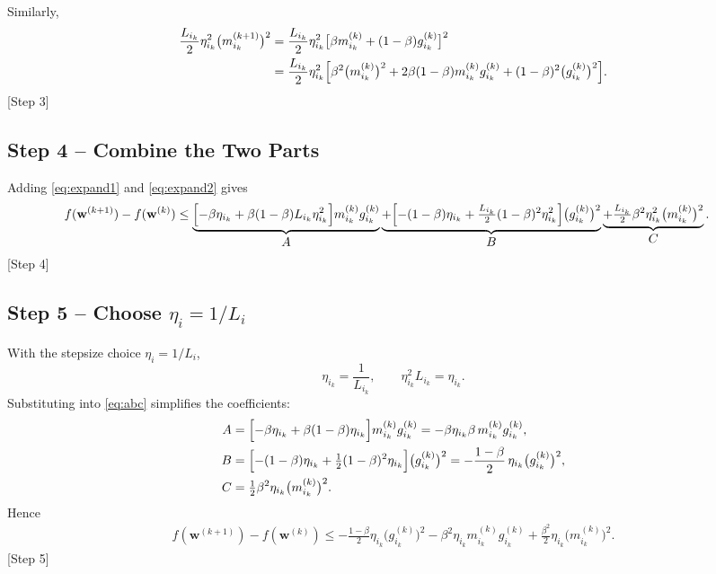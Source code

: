 \documentclass{article}
\begin{document}
Similarly,
\begin{align}
\frac{L_{i_k}}{2}\eta_{i_k}^{2}\bigl(m_{i_k}^{(k+1)}\bigr)^{2}
&=\frac{L_{i_k}}{2}\eta_{i_k}^{2}
   \bigl[\beta m_{i_k}^{(k)}+(1-\beta)g_{i_k}^{(k)}\bigr]^{2} \nonumber\\
&=\frac{L_{i_k}}{2}\eta_{i_k}^{2}
   \Bigl[\beta^{2}\bigl(m_{i_k}^{(k)}\bigr)^{2}
        +2\beta(1-\beta)m_{i_k}^{(k)}g_{i_k}^{(k)}
        +(1-\beta)^{2}\bigl(g_{i_k}^{(k)}\bigr)^{2}\Bigr]. \label{eq:expand2}
\end{align}
[Step 3]

\subsection*{Step 4 – Combine the Two Parts}
Adding \eqref{eq:expand1} and \eqref{eq:expand2} gives
\begin{align}
f(\mathbf w^{(k+1)})-f(\mathbf w^{(k)})
&\le
\underbrace{\Bigl[-\beta\eta_{i_k}+\beta(1-\beta)L_{i_k}\eta_{i_k}^{2}\Bigr] 
            m_{i_k}^{(k)} g_{i_k}^{(k)}}_{\displaystyle A}
\underbrace{+ \Bigl[-(1-\beta)\eta_{i_k}
            +\tfrac{L_{i_k}}{2}(1-\beta)^{2}\eta_{i_k}^{2}\Bigr]
            \bigl(g_{i_k}^{(k)}\bigr)^{2}}_{\displaystyle B}
\underbrace{+ \tfrac{L_{i_k}}{2}\beta^{2}\eta_{i_k}^{2}
            \bigl(m_{i_k}^{(k)}\bigr)^{2}}_{\displaystyle C}. \label{eq:abc}
\end{align}
[Step 4]

\subsection*{Step 5 – Choose $\eta_i=1/L_i$}
With the stepsize choice $\eta_i=1/L_i$,
\[
\eta_{i_k}= \frac{1}{L_{i_k}},\qquad
\eta_{i_k}^{2}L_{i_k}= \eta_{i_k}.
\]
Substituting into \eqref{eq:abc} simplifies the coefficients:
\begin{align}
A &=\Bigl[-\beta\eta_{i_k}+\beta(1-\beta)\eta_{i_k}\Bigr] m_{i_k}^{(k)} g_{i_k}^{(k)}
   =-\beta\eta_{i_k}\beta\, m_{i_k}^{(k)} g_{i_k}^{(k)} ,\\
B &=\Bigl[-(1-\beta)\eta_{i_k}
          +\tfrac{1}{2}(1-\beta)^{2}\eta_{i_k}\Bigr]\bigl(g_{i_k}^{(k)}\bigr)^{2}
   =-\frac{1-\beta}{2}\,\eta_{i_k}\bigl(g_{i_k}^{(k)}\bigr)^{2},\\
C &=\tfrac{1}{2}\beta^{2}\eta_{i_k}\bigl(m_{i_k}^{(k)}\bigr)^{2}.
\end{align}
Hence
\begin{align}
f(\mathbf w^{(k+1)})-f(\mathbf w^{(k)})
\le -\frac{1-\beta}{2}\eta_{i_k}\bigl(g_{i_k}^{(k)}\bigr)^{2}
     -\beta^{2}\eta_{i_k} m_{i_k}^{(k)} g_{i_k}^{(k)}
     +\frac{\beta^{2}}{2}\eta_{i_k}\bigl(m_{i_k}^{(k)}\bigr)^{2}. \label{eq:simplified}
\end{align}
[Step 5]
\end{document}
